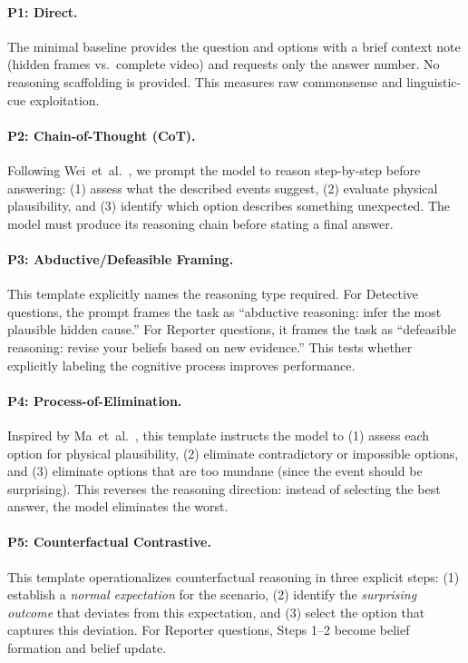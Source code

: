 \paragraph{P1: Direct.}
The minimal baseline provides the question and options with a brief context note (hidden frames vs.\ complete video) and requests only the answer number.
No reasoning scaffolding is provided.
This measures raw commonsense and linguistic-cue exploitation.

\paragraph{P2: Chain-of-Thought (CoT).}
Following Wei~et~al.~\cite{wei2022chain}, we prompt the model to reason step-by-step before answering: (1) assess what the described events suggest, (2) evaluate physical plausibility, and (3) identify which option describes something unexpected.
The model must produce its reasoning chain before stating a final answer.

\paragraph{P3: Abductive/Defeasible Framing.}
This template explicitly names the reasoning type required.
For Detective questions, the prompt frames the task as ``abductive reasoning: infer the most plausible hidden cause.''
For Reporter questions, it frames the task as ``defeasible reasoning: revise your beliefs based on new evidence.''
This tests whether explicitly labeling the cognitive process improves performance.

\paragraph{P4: Process-of-Elimination.}
Inspired by Ma~et~al.~\cite{ma2023lets}, this template instructs the model to (1) assess each option for physical plausibility, (2) eliminate contradictory or impossible options, and (3) eliminate options that are too mundane (since the event should be surprising).
This reverses the reasoning direction: instead of selecting the best answer, the model eliminates the worst.

\paragraph{P5: Counterfactual Contrastive.}
This template operationalizes counterfactual reasoning in three explicit steps: (1) establish a \emph{normal expectation} for the scenario, (2) identify the \emph{surprising outcome} that deviates from this expectation, and (3) select the option that captures this deviation.
For Reporter questions, Steps 1--2 become belief formation and belief update.

